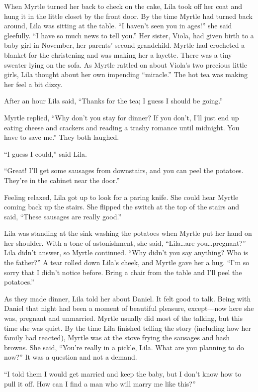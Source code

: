 \documentclass[
  letterpaper,
]{book}
\begin{document}
When Myrtle turned her back to check on the cake, Lila took off her coat
and hung it in the little closet by the front door. By the time Myrtle
had turned back around, Lila was sitting at the table. ``I haven't seen
you in ages!'' she said gleefully. ``I have so much news to tell you.''
Her sister, Viola, had given birth to a baby girl in November, her
parents' second grandchild. Myrtle had crocheted a blanket for the
christening and was making her a layette. There was a tiny sweater lying
on the sofa. As Myrtle rattled on about Viola's two precious little
girls, Lila thought about her own impending ``miracle.'' The hot tea was
making her feel a bit dizzy.

After an hour Lila said, ``Thanks for the tea; I guess I should be
going.''

Myrtle replied, ``Why don't you stay for dinner? If you don't, I'll just
end up eating cheese and crackers and reading a trashy romance until
midnight. You have to save me.'' They both laughed.

``I guess I could,'' said Lila.

``Great! I'll get some sausages from downstairs, and you can peel the
potatoes. They're in the cabinet near the door.''

Feeling relaxed, Lila got up to look for a paring knife. She could hear
Myrtle coming back up the stairs. She flipped the switch at the top of
the stairs and said, ``These sausages are really good.''

Lila was standing at the sink washing the potatoes when Myrtle put her
hand on her shoulder. With a tone of astonishment, she said,
``Lila\ldots are you\ldots pregnant?'' Lila didn't answer, so Myrtle
continued. ``Why didn't you say anything? Who is the father?'' A tear
rolled down Lila's cheek, and Myrtle gave her a hug. ``I'm so sorry that
I didn't notice before. Bring a chair from the table and I'll peel the
potatoes.''

As they made dinner, Lila told her about Daniel. It felt good to talk.
Being with Daniel that night had been a moment of beautiful pleasure,
except---now here she was, pregnant and unmarried. Myrtle usually did
most of the talking, but this time she was quiet. By the time Lila
finished telling the story (including how her family had reacted),
Myrtle was at the stove frying the sausages and hash browns. She said,
``You're really in a pickle, Lila. What are you planning to do now?'' It
was a question and not a demand.

``I told them I would get married and keep the baby, but I don't know
how to pull it off. How can I find a man who will marry me like this?''
\end{document}

